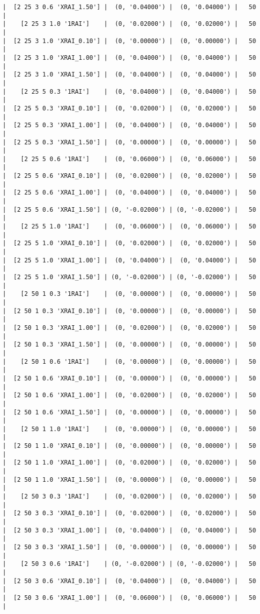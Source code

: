 \documentclass{article}
\begin{document}
\begin{verbatim}
|  [2 25 3 0.6 'XRAI_1.50'] |  (0, '0.04000') |  (0, '0.04000') |   50  |
|    [2 25 3 1.0 '1RAI']    |  (0, '0.02000') |  (0, '0.02000') |   50  |
|  [2 25 3 1.0 'XRAI_0.10'] |  (0, '0.00000') |  (0, '0.00000') |   50  |
|  [2 25 3 1.0 'XRAI_1.00'] |  (0, '0.04000') |  (0, '0.04000') |   50  |
|  [2 25 3 1.0 'XRAI_1.50'] |  (0, '0.04000') |  (0, '0.04000') |   50  |
|    [2 25 5 0.3 '1RAI']    |  (0, '0.04000') |  (0, '0.04000') |   50  |
|  [2 25 5 0.3 'XRAI_0.10'] |  (0, '0.02000') |  (0, '0.02000') |   50  |
|  [2 25 5 0.3 'XRAI_1.00'] |  (0, '0.04000') |  (0, '0.04000') |   50  |
|  [2 25 5 0.3 'XRAI_1.50'] |  (0, '0.00000') |  (0, '0.00000') |   50  |
|    [2 25 5 0.6 '1RAI']    |  (0, '0.06000') |  (0, '0.06000') |   50  |
|  [2 25 5 0.6 'XRAI_0.10'] |  (0, '0.02000') |  (0, '0.02000') |   50  |
|  [2 25 5 0.6 'XRAI_1.00'] |  (0, '0.04000') |  (0, '0.04000') |   50  |
|  [2 25 5 0.6 'XRAI_1.50'] | (0, '-0.02000') | (0, '-0.02000') |   50  |
|    [2 25 5 1.0 '1RAI']    |  (0, '0.06000') |  (0, '0.06000') |   50  |
|  [2 25 5 1.0 'XRAI_0.10'] |  (0, '0.02000') |  (0, '0.02000') |   50  |
|  [2 25 5 1.0 'XRAI_1.00'] |  (0, '0.04000') |  (0, '0.04000') |   50  |
|  [2 25 5 1.0 'XRAI_1.50'] | (0, '-0.02000') | (0, '-0.02000') |   50  |
|    [2 50 1 0.3 '1RAI']    |  (0, '0.00000') |  (0, '0.00000') |   50  |
|  [2 50 1 0.3 'XRAI_0.10'] |  (0, '0.00000') |  (0, '0.00000') |   50  |
|  [2 50 1 0.3 'XRAI_1.00'] |  (0, '0.02000') |  (0, '0.02000') |   50  |
|  [2 50 1 0.3 'XRAI_1.50'] |  (0, '0.00000') |  (0, '0.00000') |   50  |
|    [2 50 1 0.6 '1RAI']    |  (0, '0.00000') |  (0, '0.00000') |   50  |
|  [2 50 1 0.6 'XRAI_0.10'] |  (0, '0.00000') |  (0, '0.00000') |   50  |
|  [2 50 1 0.6 'XRAI_1.00'] |  (0, '0.02000') |  (0, '0.02000') |   50  |
|  [2 50 1 0.6 'XRAI_1.50'] |  (0, '0.00000') |  (0, '0.00000') |   50  |
|    [2 50 1 1.0 '1RAI']    |  (0, '0.00000') |  (0, '0.00000') |   50  |
|  [2 50 1 1.0 'XRAI_0.10'] |  (0, '0.00000') |  (0, '0.00000') |   50  |
|  [2 50 1 1.0 'XRAI_1.00'] |  (0, '0.02000') |  (0, '0.02000') |   50  |
|  [2 50 1 1.0 'XRAI_1.50'] |  (0, '0.00000') |  (0, '0.00000') |   50  |
|    [2 50 3 0.3 '1RAI']    |  (0, '0.02000') |  (0, '0.02000') |   50  |
|  [2 50 3 0.3 'XRAI_0.10'] |  (0, '0.02000') |  (0, '0.02000') |   50  |
|  [2 50 3 0.3 'XRAI_1.00'] |  (0, '0.04000') |  (0, '0.04000') |   50  |
|  [2 50 3 0.3 'XRAI_1.50'] |  (0, '0.00000') |  (0, '0.00000') |   50  |
|    [2 50 3 0.6 '1RAI']    | (0, '-0.02000') | (0, '-0.02000') |   50  |
|  [2 50 3 0.6 'XRAI_0.10'] |  (0, '0.04000') |  (0, '0.04000') |   50  |
|  [2 50 3 0.6 'XRAI_1.00'] |  (0, '0.06000') |  (0, '0.06000') |   50  |

\end{verbatim}
\end{document}
